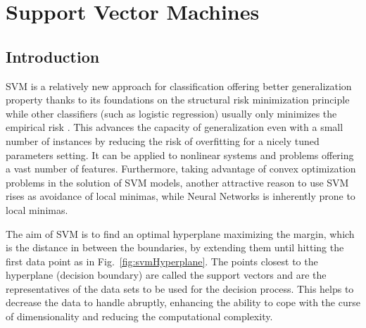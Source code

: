 \section{Support Vector Machines}

\subsection{Introduction}

SVM is a relatively new approach for classification offering better generalization property thanks to its foundations on the structural risk minimization principle while other classifiers (such as logistic regression) usually only minimizes the empirical risk \cite{gunn1998support,yin2014study}. This advances the capacity of generalization even with a small number of instances by reducing the risk of overfitting for a nicely tuned parameters setting. It can be applied to nonlinear systems and problems offering a vast number of features. Furthermore, taking advantage of convex optimization problems in the solution of SVM models, another attractive reason to use SVM rises as avoidance of local minimas, while Neural Networks is inherently prone to local minimas.


The aim of SVM is to find an optimal hyperplane maximizing the margin, which is the distance in between the boundaries, by extending them until hitting the first data point as in Fig.~\ref{fig:svmHyperplane}. The points closest to the hyperplane (decision boundary) are called the support vectors and are the representatives of the data sets to be used for the decision process. This helps to decrease the data to handle abruptly, enhancing the ability to cope with the curse of dimensionality and reducing the computational complexity.

